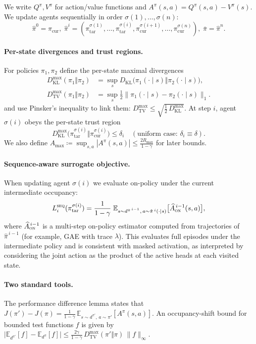 \documentclass[sigconf]{aamas}
\newcommand{\E}{\mathbb{E}}
\newcommand{\KL}{D_{\mathrm{KL}}}
\newcommand{\TV}{D_{\mathrm{TV}}}
\newcommand{\Ahat}{\widehat{A}}
\begin{document}
We write $Q^{\pi},V^{\pi}$ for action/value functions and $A^{\pi}(s,a)=Q^{\pi}(s,a)-V^{\pi}(s)$. We update agents sequentially in order $\sigma(1),\ldots,\sigma(n)$:
\[
\hat\pi^{0}=\pi_{\mathrm{cur}},\;
\hat\pi^{i}=(\pi^{\sigma(1)}_{\mathrm{tar}},\ldots,\pi^{\sigma(i)}_{\mathrm{tar}},\pi^{\sigma(i+1)}_{\mathrm{cur}},\ldots,\pi^{\sigma(n)}_{\mathrm{cur}}),\;
\bar\pi=\hat\pi^{n}.
\]

\paragraph{Per-state divergences and trust regions.}
For policies $\pi_1,\pi_2$ define the per-state maximal divergences
\begin{align*}
\KL^{\max}(\pi_1\Vert\pi_2) &= \sup_{s}\KL\!\big(\pi_1(\cdot\mid s)\Vert\pi_2(\cdot\mid s)\big), \\
\TV^{\max}(\pi_1\Vert\pi_2) &= \sup_{s}\tfrac12\|\pi_1(\cdot\mid s)-\pi_2(\cdot\mid s)\|_1.
\end{align*}
and use Pinsker's inequality to link them: $\TV^{\max}\le \sqrt{\tfrac12\,\KL^{\max}}$. At step $i$, agent $\sigma(i)$ obeys the per-state trust region
\[
\KL^{\max}\!\big(\pi^{\sigma(i)}_{\mathrm{tar}}\Vert\pi^{\sigma(i)}_{\mathrm{cur}}\big)\le \delta_i
\quad(\text{uniform case: }\delta_i\equiv\delta).
\]
We also define $A_{\max}\coloneqq \sup_{s,a}|A^{\pi}(s,a)|\le \tfrac{2R_{\max}}{1-\gamma}$ for later bounds.

\paragraph{Sequence-aware surrogate objective.}
When updating agent $\sigma(i)$ we evaluate on-policy under the current intermediate occupancy:
\[
L_i^{\textsc{seq}}(\pi^{\sigma(i)}_{\mathrm{tar}})
=\frac{1}{1-\gamma}\;
\E_{s\sim d^{\hat\pi^{\,i-1}},\,a\sim \hat\pi^{\,i}(\cdot\mid s)}
\big[\Ahat^{\,i-1}_{\textsc{on}}(s,a)\big],
\]
where $\Ahat^{\,i-1}_{\textsc{on}}$ is a multi-step on-policy estimator computed from trajectories of $\hat\pi^{\,i-1}$ (for example, GAE with trace $\lambda$). This evaluates full episodes under the intermediate policy and is consistent with masked activation, as interpreted by considering the joint action as the product of the active heads at each visited state.

\paragraph{Two standard tools.}
The performance difference lemma states that $J(\pi')-J(\pi)=\tfrac{1}{1-\gamma}\,\E_{s\sim d^{\pi'},\,a\sim\pi'}[A^{\pi}(s,a)]$. An occupancy-shift bound for bounded test functions $f$ is given by $\big|\E_{d^{\pi'}}[f]-\E_{d^{\pi}}[f]\big|\le \tfrac{2\gamma}{1-\gamma}\,\TV^{\max}(\pi'\Vert\pi)\,\|f\|_{\infty}$.
\end{document}

